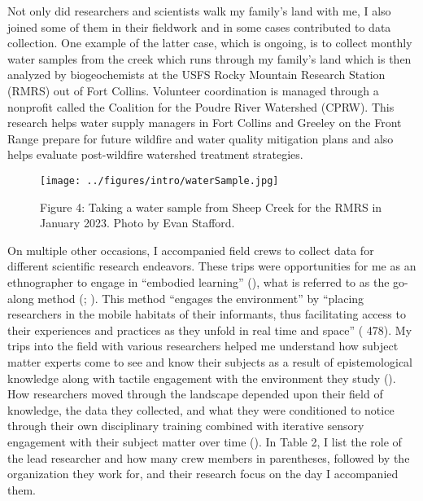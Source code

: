 \documentclass[
]{article}
\begin{document}
Not only did researchers and scientists walk my family's land with me, I also joined some of them in their fieldwork and in some cases contributed to data collection. One example of the latter case, which is ongoing, is to collect monthly water samples from the creek which runs through my family's land which is then analyzed by biogeochemists at the USFS Rocky Mountain Research Station (RMRS) out of Fort Collins. Volunteer coordination is managed through a nonprofit called the Coalition for the Poudre River Watershed (CPRW). This research helps water supply managers in Fort Collins and Greeley on the Front Range prepare for future wildfire and water quality mitigation plans and also helps evaluate post-wildfire watershed treatment strategies.

\begin{figure}
\centering
\texttt{[image: ../figures/intro/waterSample.jpg]}
\caption{Figure 4: Taking a water sample from Sheep Creek for the RMRS in January 2023. Photo by Evan Stafford.}
\end{figure}

On multiple other occasions, I accompanied field crews to collect data for different scientific research endeavors. These trips were opportunities for me as an ethnographer to engage in ``embodied learning'' (), what is referred to as the go-along method (; ). This method ``engages the environment'' by ``placing researchers in the mobile habitats of their informants, thus facilitating access to their experiences and practices as they unfold in real time and space'' ( 478). My trips into the field with various researchers helped me understand how subject matter experts come to see and know their subjects as a result of epistemological knowledge along with tactile engagement with the environment they study (). How researchers moved through the landscape depended upon their field of knowledge, the data they collected, and what they were conditioned to notice through their own disciplinary training combined with iterative sensory engagement with their subject matter over time (). In Table 2, I list the role of the lead researcher and how many crew members in parentheses, followed by the organization they work for, and their research focus on the day I accompanied them.
\end{document}
